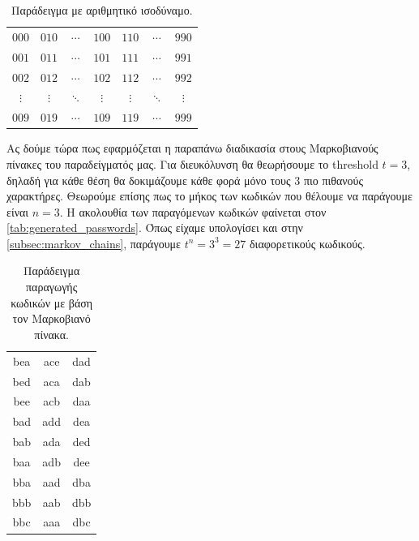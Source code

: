 \documentclass[11pt]{article}
\newenvironment{alltt}{\ttfamily}{\rmfamily}
\begin{document}
\begin{table}[h]
    \centering
    \begin{alltt}
        \begin{tabular}{ccccccc}
            $000$ & $010$ & $\cdots$ & $100$ & $110$ & $\cdots$ & $990$ \\
            $001$ & $011$ & $\cdots$ & $101$ & $111$ & $\cdots$ & $991$ \\
            $002$ & $012$ & $\cdots$ & $102$ & $112$ & $\cdots$ & $992$ \\
            $\vdots$ & $\vdots$ & $\ddots$ & $\vdots$ & $\vdots$ & $\ddots$ & $\vdots$ \\
            $009$ & $019$ & $\cdots$ & $109$ & $119$ & $\cdots$ & $999$ \\
        \end{tabular}
    \end{alltt}
    \caption{Παράδειγμα με αριθμητικό ισοδύναμο.\label{tab:arithmetic_equivalent}}
\end{table}

Ας δούμε τώρα πως εφαρμόζεται η παραπάνω διαδικασία στους Μαρκοβιανούς πίνακες του παραδείγματός μας. Για διευκόλυνση θα θεωρήσουμε το threshold $t=3$, δηλαδή για κάθε θέση θα δοκιμάζουμε κάθε φορά μόνο τους 3 πιο πιθανούς χαρακτήρες. Θεωρούμε επίσης πως το μήκος των κωδικών που θέλουμε να παράγουμε είναι $n=3$. Η ακολουθία των παραγόμενων κωδικών φαίνεται στον \autoref{tab:generated_passwords}. Όπως είχαμε υπολογίσει και στην \autoref{subsec:markov_chains}, παράγουμε $t^n=3^3=27$ διαφορετικούς κωδικούς.

\begin{table}[h]
    \centering
    \begin{alltt}
        \begin{tabular}{ccc}
            bea & ace & dad \\
            bed & aca & dab \\
            bee & acb & daa \\[1em]
            bad & add & dea \\
            bab & ada & ded \\
            baa & adb & dee \\[1em]
            bba & aad & dba \\
            bbb & aab & dbb \\
            bbc & aaa & dbc \\
        \end{tabular}
    \end{alltt}
    \caption{Παράδειγμα παραγωγής κωδικών με βάση τον Μαρκοβιανό πίνακα.\label{tab:generated_passwords}}
\end{table}
\end{document}
